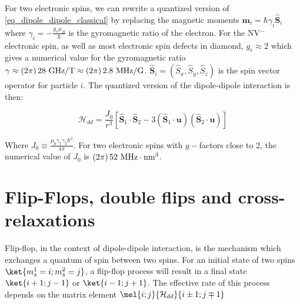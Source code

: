 \documentclass[a4paper]{book}
\begin{document}
For two electronic spins, we can rewrite a quantized version of \ref{eq_dipole_dipole_classical} by replacing the magnetic moments $\mathbf{m}_i=\hbar \gamma_i \hat{\mathbf{S}}_i$ where $\gamma_i=-\frac{g_e \mu_B}{\hbar}$ is the gyromagnetic ratio of the electron. For the NV$^-$ electronic spin, as well as most electronic spin defects in diamond, $g_e\approx 2$ which gives a numerical value for the gyromagnetic ratio $\gamma \approx (2\pi)\,28\ \rm{GHz/T} \approx (2\pi)\,2.8\ \rm MHz/G$. $\hat{\mathbf{S}}_i=(\hat S_x, \hat S_y, \hat S_z)$ is the spin vector operator for particle $i$. The quantized version of the dipole-dipole interaction is then:

\begin{equation}
\mathcal{H}_{dd}=\frac{J_0}{r^3}\left[ \hat{\mathbf{S}}_1\cdot\hat{\mathbf{S}}_2 - 3 (\hat{\mathbf{S}}_1\cdot\mathbf{u})(\hat{\mathbf{S}}_2\cdot\mathbf{u})\right]
\end{equation}

Where $J_0\equiv \frac{\mu_0\gamma_1\gamma_2 \hbar^2}{4\pi}$. For two electronic spins with $g-$factors close to 2, the numerical value of $J_0$ is $(2\pi)\,52\ \rm{MHz}\cdot\rm{nm}^3$.

\section{Flip-Flops, double flips and cross-relaxations}

Flip-flop, in the context of dipole-dipole interaction, is the mechanism which exchanges a quantum of spin between two spins. For an initial state of two spins $\ket{m_s^1=i;m_s^2=j}$, a flip-flop process will result in a final state $\ket{i+1;j-1}$ or $\ket{i-1;j+1}$. The effective rate of this process depends on the matrix element $\mel{i;j}{\mathcal{H}_{dd}}{i\pm 1;j \mp 1}$

\printbibliography
\end{document}
